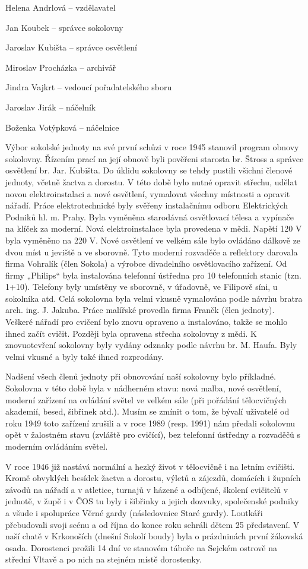 Helena Andrlová -- vzdělavatel

Jan Koubek -- správce sokolovny

Jaroslav Kubišta -- správce osvětlení

Miroslav Procházka -- archivář

Jindra Vajkrt -- vedoucí pořadatelského sboru

Jaroslav Jirák -- náčelník

Boženka Votýpková -- náčelnice

Výbor sokolské jednoty na své první schůzi v roce 1945 stanovil program
obnovy sokolovny. Řízením prací na její obnově byli pověřeni starosta
br. Štross a správce osvětlení br. Jar. Kubišta. Do úklidu sokolovny se
tehdy pustili všichni členové jednoty, včetně žactva a dorostu. V této
době bylo nutné opravit střechu, udělat novou elektroinstalaci a nové
osvětlení, vymalovat všechny místnosti a opravit nářadí. Práce
elektrotechnické byly svěřeny instalačnímu odboru Elektrických Podniků
hl. m. Prahy. Byla vyměněna starodávná osvětlovací tělesa a vypínače na
klíček za moderní. Nová elektroinstalace byla provedena v mědi. Napětí
120 V byla vyměněno na 220 V. Nové osvětlení ve velkém sále bylo
ovládáno dálkově ze dvou míst u jeviště a ve sborovně. Tyto moderní
rozvaděče a reflektory darovala firma Vohralík (člen Sokola) a výrobce
divadelního osvětlovacího zařízení. Od firmy „Philips`` byla instalována
telefonní ústředna pro 10 telefonních stanic (tzn. 1+10). Telefony byly
umístěny ve sborovně, v úřadovně, ve Filipově síni, u sokolníka atd.
Celá sokolovna byla velmi vkusně vymalována podle návrhu bratra arch.
ing. J. Jakuba. Práce malířské provedla firma Franěk (člen jednoty).
Veškeré nářadí pro cvičení bylo znovu opraveno a instalováno, takže se
mohlo ihned začít cvičit. Později byla opravena střecha sokolovny z
mědi. K znovuotevření sokolovny byly vydány odznaky podle návrhu br. M.
Haufa. Byly velmi vkusné a byly také ihned rozprodány.

Nadšení všech členů jednoty při obnovování naší sokolovny bylo
příkladné. Sokolovna v této době byla v nádherném stavu: nová malba,
nové osvětlení, moderní zařízení na ovládání světel ve velkém sále (při
pořádání tělocvičných akademií, besed, šibřinek atd.). Musím se zmínit o
tom, že bývalí uživatelé od roku 1949 toto zařízení zrušili a v roce
1989 (resp. 1991) nám předali sokolovnu opět v žalostném stavu (zvláště
pro cvičící), bez telefonní ústředny a rozvaděčů s moderním ovládáním
světel.

V roce 1946 již nastává normální a hezký život v tělocvičně i na letním
cvičišti. Kromě obvyklých besídek žactva a dorostu, výletů a zájezdů,
domácích i župních závodů na nářadí a v atletice, turnajů v házené a
odbíjené, školení cvičitelů v jednotě, v župě i v ČOS tu byly i šibřinky
a jejich dozvuky, společenské podniky a všude i spolupráce Věrné gardy
(následovnice Staré gardy). Loutkáři přebudovali svoji scénu a od října
do konce roku sehráli dětem 25 představení. V naší chatě v Krkonoších
(dnešní Sokolí boudy) byla o prázdninách první žákovská osada.
Dorostenci prožili 14 dní ve stanovém táboře na Sejckém ostrově na
střední Vltavě a po nich na stejném místě dorostenky.

